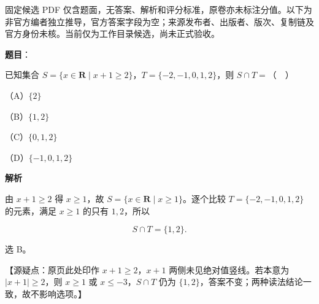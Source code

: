 

\begin{gktip}
固定候选 PDF 仅含题面，无答案、解析和评分标准，原卷亦未标注分值。以下为非官方编者独立推导，官方答案字段为空；来源发布者、出版者、版次、复制链及官方身份未核。当前仅为工作目录候选，尚未正式验收。
\end{gktip}

\begin{answer}

\textbf{题目}：

已知集合 $S=\{x\in\mathbf R\mid x+1\geqslant 2\}$，$T=\{-2,-1,0,1,2\}$，则 $S\cap T=$（　）

（A）$\{2\}$

（B）$\{1,2\}$

（C）$\{0,1,2\}$

（D）$\{-1,0,1,2\}$

\textbf{解析}

由 $x+1\geqslant2$ 得 $x\geqslant1$，故 $S=\{x\in\mathbf R\mid x\geqslant1\}$。逐个比较 $T=\{-2,-1,0,1,2\}$ 的元素，满足 $x\geqslant1$ 的只有 $1,2$，所以

\nopagebreak[4]
\[S\cap T=\{1,2\}.\]

选 B。

【源疑点：原页此处印作 $x+1\geqslant2$，$x+1$ 两侧未见绝对值竖线。若本意为 $|x+1|\geqslant2$，则 $x\geqslant1$ 或 $x\leqslant-3$，$S\cap T$ 仍为 $\{1,2\}$，答案不变；两种读法结论一致，故不影响选项。】


\end{answer}
